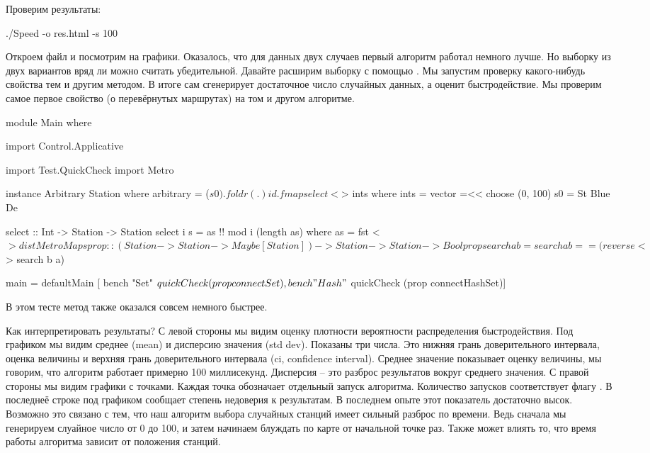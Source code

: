 Проверим результаты:


\begin{code}
./Speed -o res.html -s 100 
\end{code}

Откроем файл  и посмотрим на графики. Оказалось, что для
данных двух случаев первый алгоритм работал немного лучше. Но выборку из
двух вариантов вряд ли можно считать убедительной. Давайте расширим
выборку с помощью . Мы запустим проверку какого-нибудь
свойства тем и другим методом. В итоге  сам сгенерирует
достаточное число случайных данных, а  оценит
быстродействие. Мы проверим самое первое свойство (о перевёрнутых
маршрутах) на том и другом алгоритме.


\begin{code}
module Main where

import Control.Applicative

import Test.QuickCheck
import Metro

instance Arbitrary Station where
    arbitrary = ($ s0) . foldr (.) id . fmap select <$> ints
        where ints = vector =<< choose (0, 100)
              s0 = St Blue De

select :: Int -> Station -> Station
select i s = as !! mod i (length as)
    where as = fst <$> distMetroMap s

prop :: (Station -> Station -> Maybe [Station]) 
	-> Station -> Station -> Bool
prop search a b = search a b == (reverse <$> search b a)

main = defaultMain [
	bench "Set"  $ quickCheck (prop connectSet),
	bench "Hash" $ quickCheck (prop connectHashSet)]
\end{code}

В этом тесте метод  также оказался совсем немного быстрее.

Как интерпретировать результаты? С левой стороны мы видим оценку
плотности вероятности распределения быстродействия. Под графиком мы
видим среднее (mean) и дисперсию значения (std dev). Показаны три числа.
Это нижняя грань доверительного интервала, оценка величины и верхняя
грань доверительного интервала (ci, confidence interval). Среднее
значение показывает оценку величины, мы говорим, что алгоритм работает
примерно 100 миллисекунд. Дисперсия -- это разброс результатов вокруг
среднего значения. С правой стороны мы видим графики с точками. Каждая
точка обозначает отдельный запуск алгоритма. Количество запусков
соответствует флагу . В последнеё строке под графиком
 сообщает степень недоверия к результатам. В последнем
опыте этот показатель достаточно высок. Возможно это связано с тем, что
наш алгоритм выбора случайных станций имеет сильный разброс по времени.
Ведь сначала мы генерируем слуайное число  от 0 до 100, и затем
начинаем блуждать по карте от начальной точке  раз. Также может
влиять то, что время работы алгоритма зависит от положения станций.


